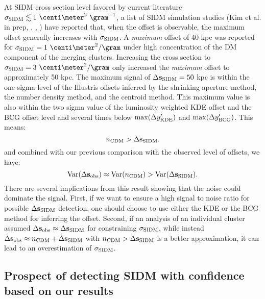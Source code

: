 At SIDM cross section level favored by current literature $\sigmaSIDM
\lesssim 1~\centi\meter^2 ~\gram^{-1}$, a list of SIDM simulation studies (Kim
et al. in prep, \citealt{Robertson2016}, \citealt{Kahlhoefer14}, \citealt{Randall2008d})
have reported that, when the offset is observable, 
the maximum offset generally increases with $\sigma_{\rm SIDM}$. 
A {\it maximum} offset of 40 kpc was reported for $\sigmaSIDM = 1
~\centi\meter^2 / \gram$ under high concentration of the DM component of the 
merging clusters. Increasing the cross section to $\sigmaSIDM = 3
~\centi\meter^2 / \gram$ only increased the {\it maximum} offset to 
approximately 50 kpc.
The maximum signal of $\Delta {\bf s}_{\rm SIDM} = 50$ kpc is within 
the one-sigma level of the Illustris offsets 
inferred by the shrinking aperture method, the number density method, and the
centroid method. This maximum value is also within the two sigma value of the
luminosity weighted KDE offset and the BCG offset level and several times below
$\max(\Delta y_{\rm KDE}')$ and $\max(\Delta y_{\rm BCG}')$. 
This means:
\begin{equation}
	n_{\rm CDM} > \Delta {\bf s}_{\rm SIDM}.
\end{equation}
and combined with our previous comparison with the observed level of offsets,
we have:
\begin{equation}
	\mathrm{Var}(\Delta {\bf s}_{\rm obs}) \approx \mathrm{Var}(n_{\rm CDM}) > \mathrm{Var}(\Delta {\bf s}_{\rm SIDM}).
\end{equation}
There are several implications from this result showing that the 
noise could dominate the signal. 
First, if we want to ensure a high signal to noise ratio for possible
$\Delta {\bf s}_{\rm SIDM}$ detection, one should choose to use either the KDE or the 
BCG method for inferring the offset.
Second, if an analysis of an individual cluster assumed $\Delta {\bf s}_{\rm obs} \approx \Delta {\bf s}_{\rm SIDM}$ 
for constraining $\sigma_{\rm SIDM}$,
while instead $\Delta {\bf s}_{\rm obs} \approx n_{\rm CDM} + \Delta {\bf s}_{\rm SIDM}$ with
$n_{\rm CDM} >
\Delta {\bf s}_{\rm SIDM}$ is a better approximation, it  
can lead to an overestimation of $\sigma_{\rm SIDM}$. 

\subsection{Prospect of detecting SIDM with confidence based on our results} 
\label{subsec:prospect_of_detecting_SIDM}

